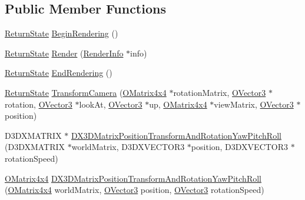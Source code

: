 \subsection*{Public Member Functions}
\begin{DoxyCompactItemize}
\item 
\hyperlink{namespace_osiris_i_a8f53bf938dc75c65c6a529694514013e}{Return\-State} \hyperlink{class_osiris_i_1_1_graphics_1_1_renderer_1_1_direct_x11_renderer_a4f6bebdcf9d286b8fc19276630fd7737}{Begin\-Rendering} ()
\item 
\hyperlink{namespace_osiris_i_a8f53bf938dc75c65c6a529694514013e}{Return\-State} \hyperlink{class_osiris_i_1_1_graphics_1_1_renderer_1_1_direct_x11_renderer_a8e86c44e7b68b266e7ff288eaabe21f0}{Render} (\hyperlink{struct_osiris_i_1_1_graphics_1_1_renderer_1_1_render_info}{Render\-Info} $\ast$info)
\item 
\hyperlink{namespace_osiris_i_a8f53bf938dc75c65c6a529694514013e}{Return\-State} \hyperlink{class_osiris_i_1_1_graphics_1_1_renderer_1_1_direct_x11_renderer_afcd55666d36232a6e637788c038a10b8}{End\-Rendering} ()
\item 
\hyperlink{namespace_osiris_i_a8f53bf938dc75c65c6a529694514013e}{Return\-State} \hyperlink{class_osiris_i_1_1_graphics_1_1_renderer_1_1_direct_x11_renderer_afbe5446f10c23c3e19a4d2fab192cabb}{Transform\-Camera} (\hyperlink{struct_osiris_i_1_1_o_matrix4x4}{O\-Matrix4x4} $\ast$rotation\-Matrix, \hyperlink{struct_osiris_i_1_1_o_vector3}{O\-Vector3} $\ast$rotation, \hyperlink{struct_osiris_i_1_1_o_vector3}{O\-Vector3} $\ast$look\-At, \hyperlink{struct_osiris_i_1_1_o_vector3}{O\-Vector3} $\ast$up, \hyperlink{struct_osiris_i_1_1_o_matrix4x4}{O\-Matrix4x4} $\ast$view\-Matrix, \hyperlink{struct_osiris_i_1_1_o_vector3}{O\-Vector3} $\ast$position)
\item 
D3\-D\-X\-M\-A\-T\-R\-I\-X $\ast$ \hyperlink{class_osiris_i_1_1_graphics_1_1_renderer_1_1_direct_x11_renderer_ad16756f89ae8fdfebb25c2a8d8296fc8}{D\-X3\-D\-Matrix\-Position\-Transform\-And\-Rotation\-Yaw\-Pitch\-Roll} (D3\-D\-X\-M\-A\-T\-R\-I\-X $\ast$world\-Matrix, D3\-D\-X\-V\-E\-C\-T\-O\-R3 $\ast$position, D3\-D\-X\-V\-E\-C\-T\-O\-R3 $\ast$rotation\-Speed)
\item 
\hyperlink{struct_osiris_i_1_1_o_matrix4x4}{O\-Matrix4x4} \hyperlink{class_osiris_i_1_1_graphics_1_1_renderer_1_1_direct_x11_renderer_a0c5fd3751586a75d565e198607a7ab64}{D\-X3\-D\-Matrix\-Position\-Transform\-And\-Rotation\-Yaw\-Pitch\-Roll} (\hyperlink{struct_osiris_i_1_1_o_matrix4x4}{O\-Matrix4x4} world\-Matrix, \hyperlink{struct_osiris_i_1_1_o_vector3}{O\-Vector3} position, \hyperlink{struct_osiris_i_1_1_o_vector3}{O\-Vector3} rotation\-Speed)

\end{DoxyCompactItemize}
